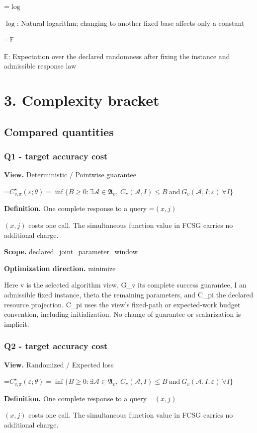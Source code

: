 \documentclass[10pt,a4paper]{article}
\newcommand{\AtlasMath}[1]{\par\begingroup\centering\setbox0=\hbox{$\displaystyle #1$}\ifdim\wd0>1.4\linewidth\typeout{ATLAS WIDE FORMULA: \the\wd0}\fi\ifdim\wd0>\linewidth\resizebox{\linewidth}{!}{\box0}\else\box0\fi\par\endgroup}
\newcommand{\AtlasInlineMath}[1]{\begingroup\setbox0=\hbox{$#1$}\ifdim\wd0>.4\linewidth\endgroup\AtlasMath{#1}\else\endgroup$#1$\fi}
\begin{document}
\AtlasInlineMath{\log}: Natural logarithm; changing to another fixed base affects only a constant

\AtlasInlineMath{\mathbb{E}}: Expectation over the declared randomness after fixing the instance and admissible response law

\section{3. Complexity bracket}
\subsection{Compared quantities}
\subsubsection{Q1 - target accuracy cost}
\textbf{View.} Deterministic / Pointwise guarantee

\AtlasMath{C^\star_{v,\pi}(\varepsilon;\theta)=\inf\{B\ge0:\exists\mathcal A\in\mathfrak A_v,\ C_\pi(\mathcal A,I)\le B\ \text{and}\ G_v(\mathcal A,I;\varepsilon)\ \forall I\}}
\textbf{Definition.} One complete response to a query \AtlasInlineMath{(x,j)} costs one call. The simultaneous function value in FCSG carries no additional charge.

\textbf{Scope.} declared\_joint\_parameter\_window

\textbf{Optimization direction.} minimize

Here v is the selected algorithm view, G\_v its complete success guarantee, I an admissible fixed instance, theta the remaining parameters, and C\_pi the declared resource projection. C\_pi uses the view's fixed-path or expected-work budget convention, including initialization. No change of guarantee or scalarization is implicit.

\subsubsection{Q2 - target accuracy cost}
\textbf{View.} Randomized / Expected loss

\AtlasMath{C^\star_{v,\pi}(\varepsilon;\theta)=\inf\{B\ge0:\exists\mathcal A\in\mathfrak A_v,\ C_\pi(\mathcal A,I)\le B\ \text{and}\ G_v(\mathcal A,I;\varepsilon)\ \forall I\}}
\textbf{Definition.} One complete response to a query \AtlasInlineMath{(x,j)} costs one call. The simultaneous function value in FCSG carries no additional charge.
\end{document}
